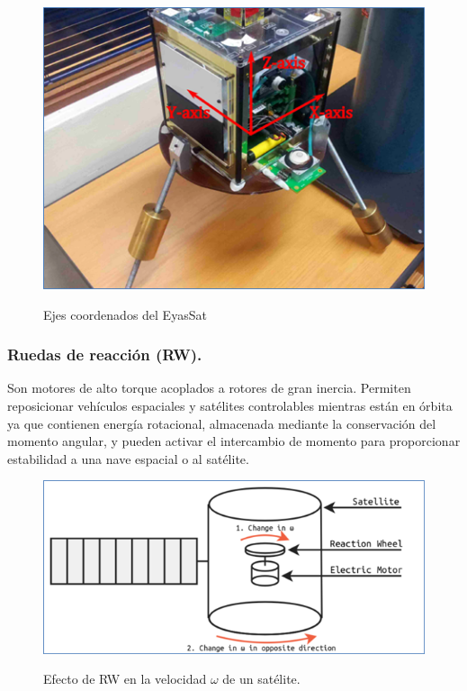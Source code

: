 \begin{figure}[!ht]
	\begin{center}
		\includegraphics[scale=0.9]{imagenes/marco_teorico/eyassat_axes.PNG}\\
	\end{center}
	\caption{ Ejes coordenados del EyasSat\cite{Groenewald2014}}
	\label{fig:eyassat_axes}
\end{figure}


\subsubsection{Ruedas de reacción (RW).}

Son motores de alto torque acoplados a rotores de gran inercia. Permiten reposicionar vehículos espaciales y satélites controlables mientras están en órbita ya que contienen energía rotacional, almacenada mediante la conservación del momento angular, y pueden activar el intercambio de momento para proporcionar estabilidad a una nave espacial o al satélite.


\begin{figure}[!ht]
	\begin{center}
		\includegraphics[scale=0.9]{imagenes/marco_teorico/rw.PNG}\\
	\end{center}
	\caption{ Efecto de RW en la velocidad $\omega$ de un satélite\cite{opc:Charles2019}.}
	\label{fig:rw_diagram}
\end{figure}

